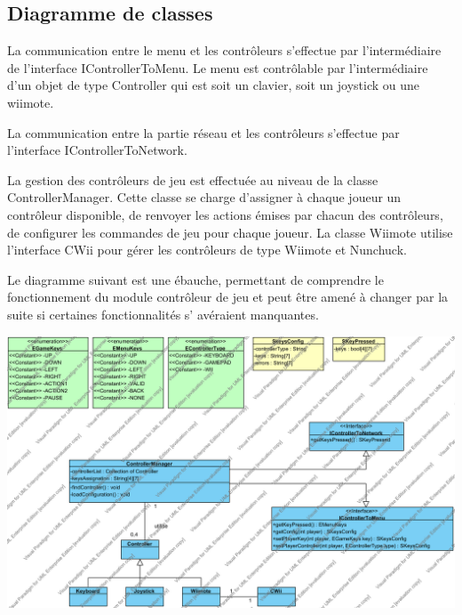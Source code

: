 \subsection{Diagramme de classes}

La communication entre le menu et les contrôleurs s'effectue par l'intermédiaire de l'interface IControllerToMenu. Le menu est contrôlable par l'intermédiaire d'un objet de type Controller qui est soit un clavier, soit un joystick ou une wiimote.


La communication entre la partie réseau et les contrôleurs s'effectue par l'interface IControllerToNetwork.

La gestion des contrôleurs de jeu est effectuée au niveau de la classe ControllerManager. Cette classe se charge d'assigner à chaque joueur un contrôleur disponible, de renvoyer les actions émises par chacun des contrôleurs, de configurer les commandes de jeu pour chaque joueur. La classe Wiimote utilise l'interface CWii pour gérer les contrôleurs de type Wiimote et Nunchuck.

Le diagramme suivant est une ébauche, permettant de comprendre le fonctionnement du module contrôleur de jeu et peut être amené à changer par la suite si certaines fonctionnalités s' avéraient manquantes.

	\includegraphics[angle=90]{images/UML/classDiagram/controller}
